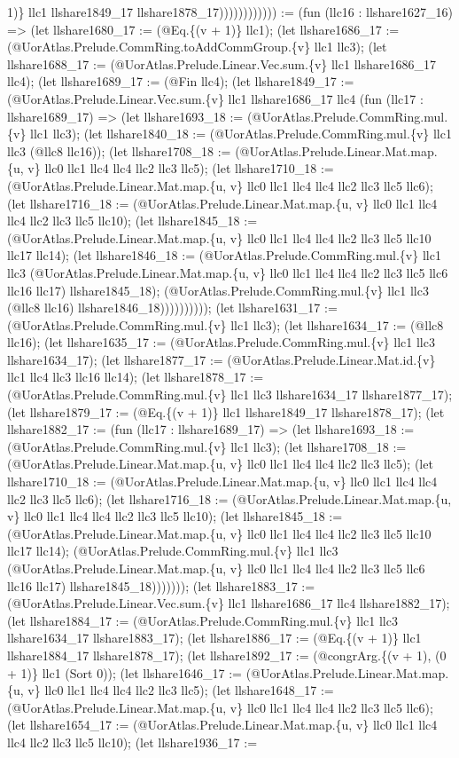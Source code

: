 \documentclass[11pt]{article}
\begin{document}
1)\} llc1 llshare1849\_17 llshare1878\_17)))))))))))) := (fun (llc16 : llshare1627\_16) => (let llshare1680\_17 := (@Eq.\{(v + 1)\} llc1); (let llshare1686\_17 := (@UorAtlas.Prelude.CommRing.toAddCommGroup.\{v\} llc1 llc3); (let llshare1688\_17 := (@UorAtlas.Prelude.Linear.Vec.sum.\{v\} llc1 llshare1686\_17 llc4); (let llshare1689\_17 := (@Fin llc4); (let llshare1849\_17 := (@UorAtlas.Prelude.Linear.Vec.sum.\{v\} llc1 llshare1686\_17 llc4 (fun (llc17 : llshare1689\_17) => (let llshare1693\_18 := (@UorAtlas.Prelude.CommRing.mul.\{v\} llc1 llc3); (let llshare1840\_18 := (@UorAtlas.Prelude.CommRing.mul.\{v\} llc1 llc3 (@llc8 llc16)); (let llshare1708\_18 := (@UorAtlas.Prelude.Linear.Mat.map.\{u, v\} llc0 llc1 llc4 llc4 llc2 llc3 llc5); (let llshare1710\_18 := (@UorAtlas.Prelude.Linear.Mat.map.\{u, v\} llc0 llc1 llc4 llc4 llc2 llc3 llc5 llc6); (let llshare1716\_18 := (@UorAtlas.Prelude.Linear.Mat.map.\{u, v\} llc0 llc1 llc4 llc4 llc2 llc3 llc5 llc10); (let llshare1845\_18 := (@UorAtlas.Prelude.Linear.Mat.map.\{u, v\} llc0 llc1 llc4 llc4 llc2 llc3 llc5 llc10 llc17 llc14); (let llshare1846\_18 := (@UorAtlas.Prelude.CommRing.mul.\{v\} llc1 llc3 (@UorAtlas.Prelude.Linear.Mat.map.\{u, v\} llc0 llc1 llc4 llc4 llc2 llc3 llc5 llc6 llc16 llc17) llshare1845\_18); (@UorAtlas.Prelude.CommRing.mul.\{v\} llc1 llc3 (@llc8 llc16) llshare1846\_18)))))))))); (let llshare1631\_17 := (@UorAtlas.Prelude.CommRing.mul.\{v\} llc1 llc3); (let llshare1634\_17 := (@llc8 llc16); (let llshare1635\_17 := (@UorAtlas.Prelude.CommRing.mul.\{v\} llc1 llc3 llshare1634\_17); (let llshare1877\_17 := (@UorAtlas.Prelude.Linear.Mat.id.\{v\} llc1 llc4 llc3 llc16 llc14); (let llshare1878\_17 := (@UorAtlas.Prelude.CommRing.mul.\{v\} llc1 llc3 llshare1634\_17 llshare1877\_17); (let llshare1879\_17 := (@Eq.\{(v + 1)\} llc1 llshare1849\_17 llshare1878\_17); (let llshare1882\_17 := (fun (llc17 : llshare1689\_17) => (let llshare1693\_18 := (@UorAtlas.Prelude.CommRing.mul.\{v\} llc1 llc3); (let llshare1708\_18 := (@UorAtlas.Prelude.Linear.Mat.map.\{u, v\} llc0 llc1 llc4 llc4 llc2 llc3 llc5); (let llshare1710\_18 := (@UorAtlas.Prelude.Linear.Mat.map.\{u, v\} llc0 llc1 llc4 llc4 llc2 llc3 llc5 llc6); (let llshare1716\_18 := (@UorAtlas.Prelude.Linear.Mat.map.\{u, v\} llc0 llc1 llc4 llc4 llc2 llc3 llc5 llc10); (let llshare1845\_18 := (@UorAtlas.Prelude.Linear.Mat.map.\{u, v\} llc0 llc1 llc4 llc4 llc2 llc3 llc5 llc10 llc17 llc14); (@UorAtlas.Prelude.CommRing.mul.\{v\} llc1 llc3 (@UorAtlas.Prelude.Linear.Mat.map.\{u, v\} llc0 llc1 llc4 llc4 llc2 llc3 llc5 llc6 llc16 llc17) llshare1845\_18))))))); (let llshare1883\_17 := (@UorAtlas.Prelude.Linear.Vec.sum.\{v\} llc1 llshare1686\_17 llc4 llshare1882\_17); (let llshare1884\_17 := (@UorAtlas.Prelude.CommRing.mul.\{v\} llc1 llc3 llshare1634\_17 llshare1883\_17); (let llshare1886\_17 := (@Eq.\{(v + 1)\} llc1 llshare1884\_17 llshare1878\_17); (let llshare1892\_17 := (@congrArg.\{(v + 1), (0 + 1)\} llc1 (Sort 0)); (let llshare1646\_17 := (@UorAtlas.Prelude.Linear.Mat.map.\{u, v\} llc0 llc1 llc4 llc4 llc2 llc3 llc5); (let llshare1648\_17 := (@UorAtlas.Prelude.Linear.Mat.map.\{u, v\} llc0 llc1 llc4 llc4 llc2 llc3 llc5 llc6); (let llshare1654\_17 := (@UorAtlas.Prelude.Linear.Mat.map.\{u, v\} llc0 llc1 llc4 llc4 llc2 llc3 llc5 llc10); (let llshare1936\_17 := 
\end{document}
